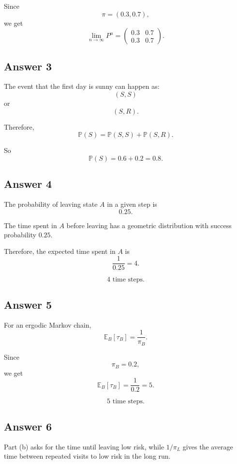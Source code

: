 \documentclass[12pt,a4paper]{article}
\theoremstyle{notestyle}
\newcommand{\Prob}{\mathbb{P}}
\newcommand{\E}{\mathbb{E}}
\begin{document}
Since
\[
\pi=(0.3,0.7),
\]
we get
\[
\lim_{n\to\infty}P^n
=
\begin{pmatrix}
0.3 & 0.7\\
0.3 & 0.7
\end{pmatrix}.
\]

\subsection*{Answer 3}

The event that the first day is sunny can happen as:
\[
(S,S)
\]
or
\[
(S,R).
\]

Therefore,
\[
\Prob(S)=\Prob(S,S)+\Prob(S,R).
\]

So
\[
\Prob(S)=0.6+0.2=0.8.
\]

\subsection*{Answer 4}

The probability of leaving state $A$ in a given step is
\[
0.25.
\]

The time spent in $A$ before leaving has a geometric distribution with success probability $0.25$.

Therefore, the expected time spent in $A$ is
\[
\frac1{0.25}=4.
\]

\[
\boxed{4\text{ time steps}.}
\]

\subsection*{Answer 5}

For an ergodic Markov chain,
\[
\E_B[\tau_B]=\frac1{\pi_B}.
\]

Since
\[
\pi_B=0.2,
\]
we get
\[
\E_B[\tau_B]=\frac1{0.2}=5.
\]

\[
\boxed{5\text{ time steps}.}
\]

\subsection*{Answer 6}

Part (b) asks for the time until leaving low risk, while $1/\pi_L$ gives the average time between repeated visits to low risk in the long run.
\end{document}
